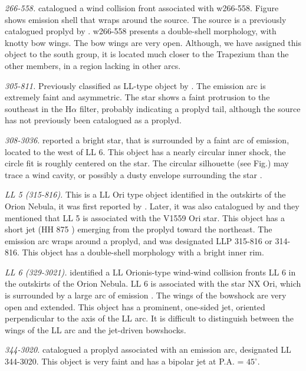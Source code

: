 \documentclass{article}
\newcommand\ha{\ensuremath{\mathrm{H}\alpha}}
\begin{document}
\textit{266-558.} \citet{Bally:2000a} catalogued a wind collision front associated with w266-558. Figure shows emission shell that wraps around the source. The source is a previously catalogued proplyd by \citet{Ricci:2008}. w266-558 presents a double-shell morphology, with knotty bow wings. The bow wings are very open. Although, we have assigned this object to the south group, it is located much closer to the Trapezium than the other members, in a region lacking in other arcs.

\textit{305-811.} Previously classified as LL-type object by \citet{Bally:2006a}. The emission arc is extremely faint and asymmetric. The star shows  a faint protrusion to the southeast in the \ha{} filter, probably indicating a proplyd tail, although the source has not previously been catalogued as a proplyd.    

\textit{308-3036.} \citet{Bally:2006a} reported a bright star, that is surrounded by a faint arc of emission, located to the west of LL 6. This object has a nearly circular inner shock, the circle fit is roughly centered on the star. The circular silhouette (see Fig.) may trace a wind cavity, or possibly a dusty envelope surrounding the star \citep{Bally:2006a}.       

\textit{LL 5 (315-816).} This is a LL Ori type object identified in the outskirts of the Orion Nebula, it was first reported by \citet{Bally:2001a}. Later, it was also catalogued by \citet{Bally:2006a} and they mentioned that LL 5 is associated with the  V1559 Ori star. This object has a short jet (HH 875 \citealp{Bally:2006a}) emerging from the proplyd toward the northeast.  The emission arc wraps around a proplyd, and was designated LLP 315-816 or 314-816. This object has a double-shell morphology with a bright inner rim.
       
\textit{LL 6 (329-3021).} \citep{Bally:2001} identified a LL Orionis-type wind-wind collision fronts LL 6 in the outskirts of the Orion Nebula. LL 6 is associated with the star NX Ori, which is surrounded by a large arc of emission \citep{Bally:2006a}. The wings of the bowshock are very open and extended. This object has a prominent, one-sided jet, oriented perpendicular to the axis of the LL arc. It is difficult to distinguish between the wings of the LL arc and the jet-driven bowshocks.    

\textit{344-3020.} \citet{Bally:2006a} catalogued a proplyd associated with an emission arc, designated LL 344-3020. This object is very faint and has a bipolar jet at P.A. = $45^{\circ}$.     
\end{document}
